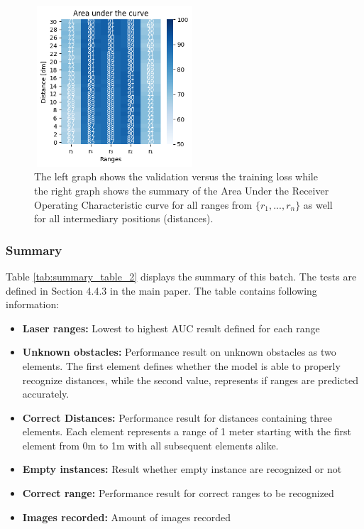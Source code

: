 \begin{figure}[H]
\hspace{0.2 cm}
\includegraphics[width=6cm,height=6cm]{4_plots/plots_11/AUC_11.png}
\caption{The left graph shows the validation versus the training loss while the right graph shows the summary of the Area Under the Receiver Operating Characteristic curve for all ranges from $\{r_{1}, ... ,r_{n}\}$ as well for all intermediary positions (distances).}
\label{auc_11}
\end{figure}


\subsubsection{Summary\label{summary_batch_2} }
Table \ref{tab:summary_table_2} displays the summary of this batch. The tests are defined in Section 4.4.3 in the main paper. The table contains following information:
\begin{itemize}
\item  \textbf{Laser ranges: }Lowest to highest AUC result defined for each range
\item  \textbf{Unknown obstacles: }Performance result on unknown obstacles as two elements. The first element defines whether the model is able to properly recognize distances, while the second value, represents if ranges are predicted accurately.
\item  \textbf{Correct Distances: }Performance result for distances containing three elements. Each element represents a range of 1 meter starting with the first element from 0m to 1m with all subsequent elements alike.
\item  \textbf{Empty instances: }Result whether empty instance are recognized or not
\item  \textbf{Correct range: }Performance result for correct ranges to be recognized
\item  \textbf{Images recorded: }Amount of images recorded
\end{itemize}

